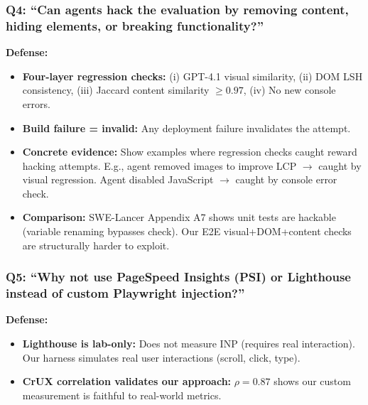 \subsubsection{Q4: ``Can agents hack the evaluation by removing content, hiding elements, or breaking functionality?''}
\textbf{Defense:}
\begin{itemize}
    \item \textbf{Four-layer regression checks:} (i) GPT-4.1 visual similarity, (ii) DOM LSH consistency, (iii) Jaccard content similarity $\geq 0.97$, (iv) No new console errors.
    \item \textbf{Build failure = invalid:} Any deployment failure invalidates the attempt.
    \item \textbf{Concrete evidence:} Show examples where regression checks caught reward hacking attempts. E.g., agent removed images to improve LCP $\rightarrow$ caught by visual regression. Agent disabled JavaScript $\rightarrow$ caught by console error check.
    \item \textbf{Comparison:} SWE-Lancer Appendix A7 shows unit tests are hackable (variable renaming bypasses check). Our E2E visual+DOM+content checks are structurally harder to exploit.
\end{itemize}

\subsubsection{Q5: ``Why not use PageSpeed Insights (PSI) or Lighthouse instead of custom Playwright injection?''}
\textbf{Defense:}
\begin{itemize}
    \item \textbf{Lighthouse is lab-only:} Does not measure INP (requires real interaction). Our harness simulates real user interactions (scroll, click, type).
    \item \textbf{CrUX correlation validates our approach:} $\rho = 0.87$ shows our custom measurement is faithful to real-world metrics.
\end{itemize}

